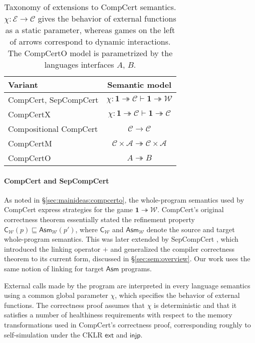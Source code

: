 \documentclass[sigplan,10pt,review,anonymous]{acmart}\settopmatter{printfolios=true,printccs=false,printacmref=false}
\newcommand{\kw}[1]{\ensuremath{ \mathsf{#1} }}
\begin{document}
\begin{table} %
  \begin{tabular}{lc}
    \hline
    Variant & Semantic model \\
    \hline
    CompCert, SepCompCert &
      $\chi : \mathbf{1} \twoheadrightarrow \mathcal{C}
       \vdash \mathbf{1} \twoheadrightarrow \mathcal{W}$ \\
    CompCertX &
      $\chi : \mathbf{1} \twoheadrightarrow \mathcal{C} \vdash
       \mathbf{1} \twoheadrightarrow \mathcal{C}$ \\
    Compositional CompCert &
      $\mathcal{C} \rightarrow \mathcal{C}$ \\
    CompCertM &
      $\mathcal{C} \times \mathcal{A} \twoheadrightarrow
       \mathcal{C} \times \mathcal{A}$ \\
    CompCertO &
      $A \twoheadrightarrow B$ \\
    \hline
  \end{tabular}
  \vspace{1ex}
  \caption{Taxonomy of extensions to CompCert semantics.
    $\chi : \mathcal{E} \rightarrow \mathcal{C}$
    gives the behavior of external functions
    as a static parameter,
    whereas games on the left of arrows
    correspond to dynamic interactions.
    The CompCertO model
    is parametrized by the languages interfaces $A$, $B$.
  }
  \label{tbl:compcerts}
\end{table}

\paragraph{CompCert and SepCompCert} %

As noted in \S\ref{sec:mainideas:compcerto},
the whole-program semantics used by CompCert
express strategies for the game
$\mathbf{1} \twoheadrightarrow \mathcal{W}$.
CompCert's original correctness theorem
essentially stated
the refinement property
$\kw{C}_\mathcal{W}(p) \sqsubseteq \kw{Asm}_\mathcal{W}(p')$,
where $\kw{C}_\mathcal{W}$ and $\kw{Asm}_\mathcal{W}$
denote the source and target whole-program semantics.
This was later extended by SepCompCert \cite{sepcompcert},
which introduced the linking operator $+$
and generalized the compiler correctness theorem to
its current form, discussed in \S\ref{sec:sem:overview}.
Our work uses the same notion of linking
for target \kw{Asm} programs.

External calls made by the program
are interpreted in every language semantics
using a common global parameter $\chi$,
which specifies the behavior of external functions.
The correctness proof assumes that $\chi$ is deterministic
and that it satisfies a number of healthiness requirements
with respect to the memory transformations
used in CompCert's correctness proof,
corresponding roughly to self-simulation
under the CKLR $\kw{ext}$ and $\kw{injp}$.
\end{document}
